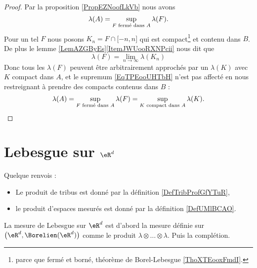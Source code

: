 \begin{proof}
    Par la proposition \ref{PropEZNoofLkVb} nous avons
    \begin{equation}    \label{EqTPEooUHTbH}
        \lambda(A)=\sup_{\text{\( F\) fermé dans \( A\)}}\lambda(F).
    \end{equation}
    Pour un tel \( F\) nous posons \( K_n=F\cap\mathopen[ -n , n \mathclose]\) qui est compact\footnote{parce que fermé et borné, théorème de Borel-Lebesgue \ref{ThoXTEooxFmdI}.} et contenu dans \( B\). De plus le lemme \ref{LemAZGByEs}\ref{ItemJWUooRXNPcii} nous dit que
    \begin{equation}
        \lambda(F)=\lim_{n\to \infty} \lambda(K_n)
    \end{equation}
    Donc tous les \( \lambda(F)\) peuvent être arbitrairement approchés par un \( \lambda(K)\) avec \( K\) compact dans \( A\), et le supremum \eqref{EqTPEooUHTbH} n'est pas affecté en nous restreignant à prendre des compacts contenus dans \( B\) :
    \begin{equation}    
        \lambda(A)=\sup_{\text{\( F\) fermé dans \( A\)}}\lambda(F)=\sup_{\text{\( K\) compact dans \( A\)}}\lambda(K).
    \end{equation}
\end{proof}

\section{Lebesgue sur \texorpdfstring{$ \eR^d$}{Rd}}

Quelque renvois :
\begin{itemize}
    \item Le produit de tribus est donné par la définition \ref{DefTribProfGfYTuR},     %
    \item le produit d'espaces mesurés est donné par la définition \ref{DefUMlBCAO}.     %
\end{itemize}

La mesure de Lebesgue sur \( \eR^d\) est d'abord la mesure définie sur \( \big( \eR^d,\Borelien(\eR^d) \big)\) comme le produit \( \lambda\otimes\ldots\otimes \lambda\). Puis la complétion.

